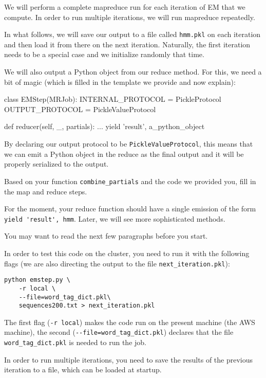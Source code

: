 We will perform a complete mapreduce run for each iteration of EM that we
compute. In order to run multiple iterations, we will run mapreduce repeatedly.

In what follows, we will save our output to a file called \verb+hmm.pkl+ on
each iteration and then load it from there on the next iteration. Naturally,
the first iteration needs to be a special case and we initialize randomly that
time.

We will also output a Python object from our reduce method. For this, we need a
bit of magic (which is filled in the template we provide and now explain):

\begin{python}
class EMStep(MRJob):
    INTERNAL_PROTOCOL   = PickleProtocol
    OUTPUT_PROTOCOL     = PickleValueProtocol

    def reducer(self, _, partials):
        ...
        yield 'result', a_python_object
\end{python}

By declaring our output protocol to be \verb+PickleValueProtocol+, this means
that we can emit a Python object in the reduce as the final output and it will
be properly serialized to the output.

\begin{exercise}
Based on your function \verb+combine_partials+ and the code we provided you, fill in
the map and reduce steps.

For the moment, your reduce function should have a single emission of the form
\verb+yield 'result', hmm+. Later, we will see more sophisticated methods.

You may want to read the next few paragraphs before you start.
\end{exercise}

In order to test this code on the cluster, you need to run it with the
following flags (we are also directing the output to the file
\verb+next_iteration.pkl+):

\begin{verbatim}
python emstep.py \
    -r local \
    --file=word_tag_dict.pkl\
    sequences200.txt > next_iteration.pkl
\end{verbatim}

The first flag (\verb+-r local+) makes the code run on the present machine (the AWS machine), the second
(\verb+--file=word_tag_dict.pkl+) declares that the file
\verb+word_tag_dict.pkl+ is needed to run the job.

In order to run multiple iterations, you need to save the results of the
previous iteration to a file, which can be loaded at startup.

